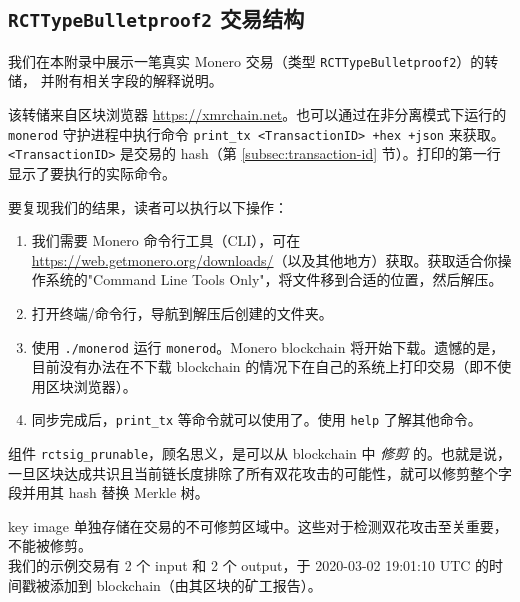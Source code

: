\begin{appendices}

\renewcommand{\theFancyVerbLine}{%
	\textcolor{red}{\small
		\arabic{FancyVerbLine}}}

\chapter{{\tt RCTTypeBulletproof2} 交易结构}
\label{appendix:RCTTypeBulletproof2}

我们在本附录中展示一笔真实 Monero 交易（类型 {\tt RCTTypeBulletproof2}）的转储，
并附有相关字段的解释说明。

该转储来自区块浏览器 \url{https://xmrchain.net}。也可以通过在非分离模式下运行的 {\tt monerod} 守护进程中执行命令 {\tt print\_tx <TransactionID> +hex +json} 来获取。{\tt <TransactionID>} 是交易的 hash（第 \ref{subsec:transaction-id} 节）。打印的第一行显示了要执行的实际命令。

要复现我们的结果，读者可以执行以下操作：
\begin{enumerate}
    \item 我们需要 Monero 命令行工具（CLI），可在 \url{https://web.getmonero.org/downloads/}（以及其他地方）获取。获取适合你操作系统的"Command Line Tools Only"，将文件移到合适的位置，然后解压。
    \item 打开终端/命令行，导航到解压后创建的文件夹。
    \item 使用 {\tt ./monerod} 运行 {\tt monerod}。Monero blockchain 将开始下载。遗憾的是，目前没有办法在不下载 blockchain 的情况下在自己的系统上打印交易（即不使用区块浏览器）。
    \item 同步完成后，{\tt print\_tx} 等命令就可以使用了。使用 {\tt help} 了解其他命令。
\end{enumerate}

组件 {\tt rctsig\_prunable}，顾名思义，是可以从 blockchain 中 {\sl 修剪} 的。也就是说，一旦区块达成共识且当前链长度排除了所有双花攻击的可能性，就可以修剪整个字段并用其 hash 替换 Merkle 树。

key image 单独存储在交易的不可修剪区域中。这些对于检测双花攻击至关重要，不能被修剪。\\

我们的示例交易有 2 个 input 和 2 个 output，于 2020-03-02 19:01:10 UTC 的时间戳被添加到 blockchain（由其区块的矿工报告）。


\end{appendices}
